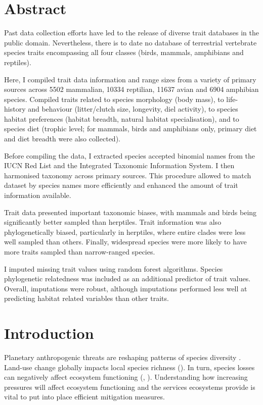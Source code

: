 \section*{Abstract}
Past data collection efforts have led to the release of diverse trait databases in the public domain. Nevertheless, there is to date no database of terrestrial vertebrate species traits encompassing all four classes (birds, mammals, amphibians and reptiles).

Here, I compiled trait data information and range sizes from a variety of primary sources  across 5502 mammalian, 10334 reptilian, 11637 avian and 6904 amphibian species. Compiled traits related to species morphology (body mass), to life-history and behaviour (litter/clutch size, longevity, diel activity), to species habitat preferences (habitat breadth, natural habitat specialisation), and to species diet (trophic level; for mammals, birds and amphibians only, primary diet and diet breadth were also collected).

Before compiling the data, I extracted species accepted binomial names from the IUCN Red List and the Integrated Taxonomic Information System. I then harmonised taxonomy across primary sources. This procedure allowed to match dataset by species names more efficiently and enhanced the amount of trait information available. 

Trait data presented important taxonomic biases, with mammals and birds being significantly better sampled than herptiles. Trait information was also phylogenetically biased, particularly in herptiles, where entire clades were less well sampled than others. Finally, widespread species were more likely to have more traits sampled than narrow-ranged species.

I imputed missing trait values using random forest algorithms. Species phylogenetic relatedness was included as an additional predictor of trait values. Overall, imputations were robust, although imputations performed less well at predicting habitat related variables than other traits. 




\section{Introduction}
Planetary anthropogenic threats are reshaping patterns of species diversity \citep{ Spooner2018, Bohm2013, Schipper2008, Stuart2004}. Land-use change globally impacts local species richness (\cite{Newbold2015}). In turn, species losses can negatively affect ecosystem functioning (\cite{Hooper2005}, \cite{Hooper2012}). Understanding how increasing pressures will affect ecosystem functioning and the services ecosystems provide is vital to put into place efficient mitigation measures.
   
